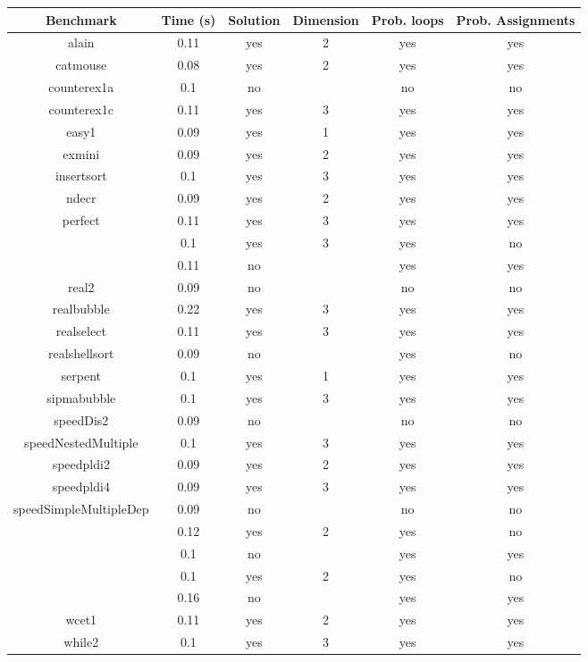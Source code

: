 \begin{center}
\begin{table}[]
  \centering
   \begin{tabular}{c|c|c|c|c|c}
    
{Benchmark} & {Time (s)} & {Solution} & {Dimension} & {Prob. loops} & {Prob. Assignments} \\\hline \hline
{alain} & {0.11} & {yes} & {2} & {yes} & {yes} \\\hline
{catmouse} & {0.08} & {yes} & {2} & {yes} & {yes} \\\hline
{counterex1a} & {0.1} & {no} & {} & {no} & {no} \\\hline
{counterex1c} & {0.11} & {yes} & {3} & {yes} & {yes} \\\hline
{easy1} & {0.09} & {yes} & {1} & {yes} & {yes} \\\hline
{exmini} & {0.09} & {yes} & {2} & {yes} & {yes} \\\hline
{insertsort} & {0.1} & {yes} & {3} & {yes} & {yes} \\\hline
{ndecr} & {0.09} & {yes} & {2} & {yes} & {yes} \\\hline
{perfect} & {0.11} & {yes} & {3} & {yes} & {yes} \\\hline
{\multirow{2}{*}{perfect2}} & {0.1} & {yes} & {3} & {yes} & {no} \\\cline{2-6}
{} & {0.11} & {no} & {} & {yes} & {yes} \\\hline
{real2} & {0.09} & {no} & {} & {no} & {no} \\\hline
{realbubble} & {0.22} & {yes} & {3} & {yes} & {yes} \\\hline
{realselect} & {0.11} & {yes} & {3} & {yes} & {yes} \\\hline
{realshellsort} & {0.09} & {no} & {} & {yes} & {no} \\\hline
{serpent} & {0.1} & {yes} & {1} & {yes} & {yes} \\\hline
{sipmabubble} & {0.1} & {yes} & {3} & {yes} & {yes} \\\hline
{speedDis2} & {0.09} & {no} & {} & {no} & {no} \\\hline
{speedNestedMultiple} & {0.1} & {yes} & {3} & {yes} & {yes} \\\hline
{speedpldi2} & {0.09} & {yes} & {2} & {yes} & {yes} \\\hline
{speedpldi4} & {0.09} & {yes} & {3} & {yes} & {yes} \\\hline
{speedSimpleMultipleDep} & {0.09} & {no} & {} & {no} & {no} \\\hline
{\multirow{2}{*}{speedSingleSingle2}} & {0.12} & {yes} & {2} & {yes} & {no} \\\cline{2-6}
{} & {0.1} & {no} & {} & {yes} & {yes} \\\hline
{\multirow{2}{*}{unperfect}} & {0.1} & {yes} & {2} & {yes} & {no} \\\cline{2-6}
{} & {0.16} & {no} & {} & {yes} & {yes} \\\hline
{wcet1} & {0.11} & {yes} & {2} & {yes} & {yes} \\\hline
{while2} & {0.1} & {yes} & {3} & {yes} & {yes} \\\hline
    

\end{tabular}
\end{table}
\end{center}
